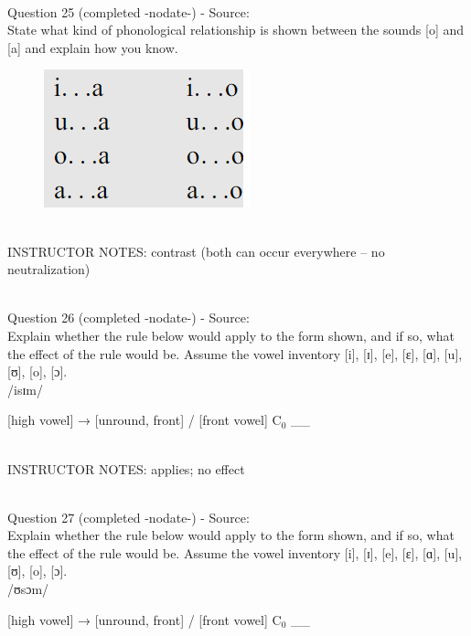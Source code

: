 \documentclass[12pt]{article}
\begin{document}
~\\

{\large Question 25} (completed -nodate-) - Source: \\

State what kind of phonological relationship is shown between the sounds [o] and [a] and explain how you know.\\

\begin{figure}[H]
\includegraphics{../images/peng70ao_d.png}
\end{figure}

~\\
INSTRUCTOR NOTES: contrast (both can occur everywhere -- no neutralization)


~\\

{\large Question 26} (completed -nodate-) - Source: \\

Explain whether the rule below would apply to the form shown, and if so, what the effect of the rule would be. Assume the vowel inventory [i], [ɪ], [e], [ɛ], [ɑ], [u], [ʊ], [o], [ɔ].\\

/isɪm/

{[high vowel]} →  {[unround, front]} / {[front vowel]} C$_0$ \_\_ 


~\\
INSTRUCTOR NOTES: applies; no effect


~\\

{\large Question 27} (completed -nodate-) - Source: \\

Explain whether the rule below would apply to the form shown, and if so, what the effect of the rule would be. Assume the vowel inventory [i], [ɪ], [e], [ɛ], [ɑ], [u], [ʊ], [o], [ɔ].\\

/ʊsɔm/

{[high vowel]} →  {[unround, front]} / {[front vowel]} C$_0$ \_\_ 
\end{document}
